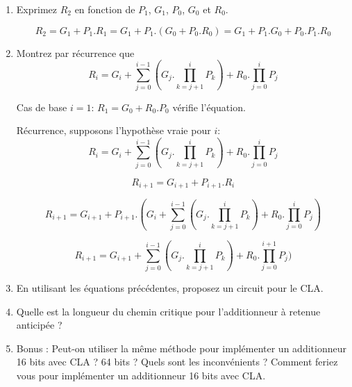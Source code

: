 \documentclass[a4paper,10pt]{exam}
\begin{document}
\begin{enumerate}
\item Exprimez $R_2$ en fonction de $P_1$, $G_1$, $P_0$, $G_0$ et $R_0$.
\begin{solution}
  $$ R_2 = G_1 + P_1.R_1 = G_1 + P_1.(G_0 + P_0.R_0) = G_1 + P_1.G_0 + P_0.P_1.R_0$$
\end{solution}

\item Montrez par récurrence que
  $$R_i = G_i + \sum^{i-1}_{j=0}{(G_j.\prod^i_{k=j+1}{P_k})} + R_0.\prod^i_{j=0}{P_j}$$

\begin{solution}
  Cas de base $i=1$: $R_1 = G_0 + R_0.P_0$ vérifie l'équation.

  Récurrence, supposons l'hypothèse vraie pour $i$:
  $$R_i = G_i + \sum^{i-1}_{j=0}{(G_j.\prod^i_{k=j+1}{P_k})} +
  R_0.\prod^i_{j=0}{P_j}$$

  $$R_{i+1} = G_{i+1} + P_{i+1}.R_{i}$$

  $$R_{i+1} = G_{i+1} + P_{i+1}.(G_i + \sum^{i-1}_{j=0}{(G_j.\prod^i_{k=j+1}{P_k})} +
  R_0.\prod^i_{j=0}{P_j})$$

  $$ R_{i+1} = G_{i+1} + \sum^{i-1}_{j=0}{(G_j.\prod^i_{k=j+1}{P_k})} +
  R_0.\prod^{i+1}_{j=0}{P_j})$$
\end{solution}

\item En utilisant les équations précédentes, proposez un circuit pour le CLA.
\item Quelle est la longueur du chemin critique pour l'additionneur à retenue
  anticipée ?
\begin{solution}

\end{solution}

\item Bonus : Peut-on utiliser la même méthode pour implémenter un additionneur
  16 bits avec CLA ? 64 bits ? Quels sont les inconvénients ? Comment feriez
  vous pour implémenter un additionneur 16 bits avec CLA.
\end{enumerate}
\end{document}
